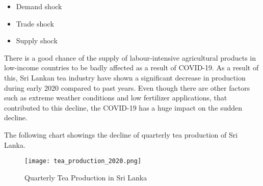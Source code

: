 \documentclass[12pt]{report}
\begin{document}
\begin{itemize}
	\item {Demand shock}
	\item {Trade shock}
	\item {Supply shock}
\end{itemize}

There is a good chance of the supply of labour-intensive agricultural products in low-income countries to be badly affected as a result of COVID-19. As a result of this, Sri Lankan tea industry have shown a significant decrease in production during early 2020 compared to past years. Even though there are other factors such as extreme weather conditions and low fertilizer applications, that contributed to this decline, the COVID-19 has a huge impact on the sudden decline.

The following chart showings the decline of quarterly tea production of Sri Lanka.
\begin{figure}[H]
	\centering
	\texttt{[image: tea\_production\_2020.png]}
	\caption{Quarterly Tea Production in Sri Lanka}
\end{figure}
\end{document}
